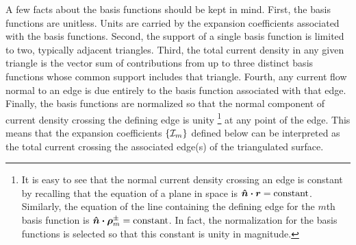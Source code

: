 %
A few facts about the basis functions should be kept in mind.  First, 
the basis functions are unitless.  Units are carried by the expansion
coefficients associated with the basis functions.  Second,
the 
support of a single basis function is limited to two, typically adjacent triangles.
Third, the total current density in any given triangle is the vector sum
of contributions from up to three distinct basis functions whose common support
includes that triangle.  Fourth, any current flow normal to an edge is due 
entirely to the basis function associated with that edge.  Finally, the
basis functions are normalized so that the normal component of current
density crossing the defining edge is unity%
%
\footnote{It is easy to see that the normal current density crossing
  an edge is constant by
recalling that the equation of a plane in space is $\boldsymbol{\hat{n}} \boldsymbol{\cdot} \boldsymbol{r} = \text{constant}$.
Similarly, the equation of the line containing the defining edge for the $m$th
basis function is $\boldsymbol{\hat{n}} \boldsymbol{\cdot} \boldsymbol{\rho}_m^{\pm} = \text{constant}$.  In fact, the
normalization for the basis functions is selected so that this constant is
unity in magnitude.}
%
at any point of the edge.
This means that the expansion
coefficients $\{\mathcal{I}_m\}$ defined below can be interpreted as the
total current
crossing the associated edge(s) of the triangulated surface.


